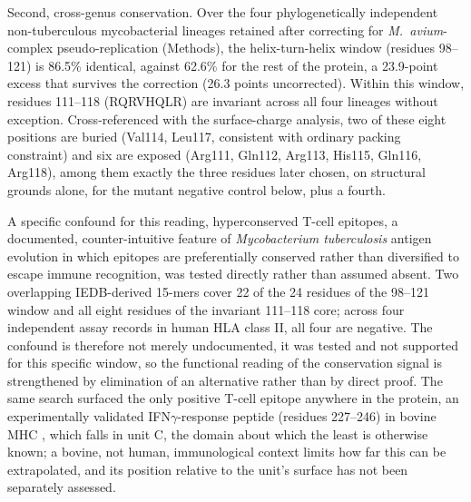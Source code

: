 \documentclass[11pt,a4paper]{article}
\newcommand{\mtb}{\textit{Mycobacterium tuberculosis}}
\begin{document}
Second, cross-genus conservation. Over the four phylogenetically independent non-tuberculous
mycobacterial lineages retained after correcting for \textit{M.\ avium}-complex pseudo-replication
(Methods), the helix-turn-helix window (residues 98--121) is 86.5\% identical, against 62.6\% for
the rest of the protein, a 23.9-point excess that survives the correction (26.3 points uncorrected).
Within this window, residues 111--118 (RQRVHQLR) are invariant across all four lineages without
exception. Cross-referenced with the surface-charge analysis, two of these eight positions are
buried (Val114, Leu117, consistent with ordinary packing constraint) and six are exposed (Arg111,
Gln112, Arg113, His115, Gln116, Arg118), among them exactly the three residues later chosen, on
structural grounds alone, for the mutant negative control below, plus a fourth.

A specific confound for this reading, hyperconserved T-cell epitopes, a documented, counter-intuitive
feature of \mtb{} antigen evolution in which epitopes are preferentially conserved rather than
diversified to escape immune recognition, was tested directly rather than assumed absent. Two
overlapping IEDB-derived 15-mers cover 22 of the 24 residues of the 98--121 window and all eight
residues of the invariant 111--118 core; across four independent assay records in human HLA class II,
all four are negative. The confound is therefore not merely undocumented, it was tested and not
supported for this specific window, so the functional reading of the conservation signal is
strengthened by elimination of an alternative rather than by direct proof. The same search surfaced
the only positive T-cell epitope anywhere in the protein, an experimentally validated
IFN$\gamma$-response peptide (residues 227--246) in bovine MHC \citep{farrell2016botb}, which falls
in unit C, the domain about which the least is otherwise known; a bovine, not human, immunological
context limits how far this can be extrapolated, and its position relative to the unit's surface has
not been separately assessed.
\end{document}
